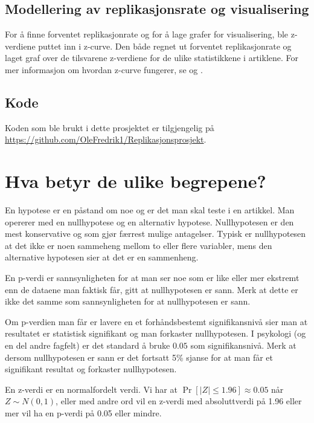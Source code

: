 \documentclass[doc,norsk]{apa7}
\begin{document}
\subsection{Modellering av replikasjonsrate og visualisering}
For å finne forventet replikasjonrate og for å lage grafer for visualisering, ble z-verdiene puttet inn i z-curve. Den både regnet ut forventet replikasjonrate og laget graf over de tilsvarene z-verdiene for de ulike statistikkene i artiklene. For mer informasjon om hvordan z-curve fungerer, se \textcite{z-curve-modell} og \textcite{z-curve-implementasjon}. 

\subsection{Kode}
Koden som ble brukt i dette prosjektet er tilgjengelig på \url{https://github.com/OleFredrik1/Replikasjonsprosjekt}.

\section{Hva betyr de ulike begrepene?}
En hypotese er en påstand om noe og er det man skal teste i en artikkel. Man opererer med en nullhypotese og en alternativ hypotese. Nullhypotesen er den mest konservative og som gjør færrest mulige antagelser. Typisk er nullhypotesen at det ikke er noen sammeheng mellom to eller flere variabler, mens den alternative hypotesen sier at det er en sammenheng.

En p-verdi er sannsynligheten for at man ser noe som er like eller mer ekstremt enn de dataene man faktisk får, gitt at nullhypotesen er sann. Merk at dette er ikke det samme som sannsynligheten for at nullhypotesen er sann.

Om p-verdien man får er lavere en et forhåndsbestemt signifikansnivå sier man at resultatet er statistisk signifikant og man forkaster nullhypotesen. I psykologi (og en del andre fagfelt) er det standard å bruke $0.05$ som signifikansnivå. Merk at dersom nullhypotesen er sann er det fortsatt 5\% sjanse for at man får et signifikant resultat og forkaster nullhypotesen.

En z-verdi er en normalfordelt verdi. Vi har at $\Pr[|Z| \leq 1.96] \approx 0.05$ når $Z \sim N(0, 1)$, eller med andre ord vil en z-verdi med absoluttverdi på 1.96 eller mer vil ha en p-verdi på 0.05 eller mindre.
\end{document}
